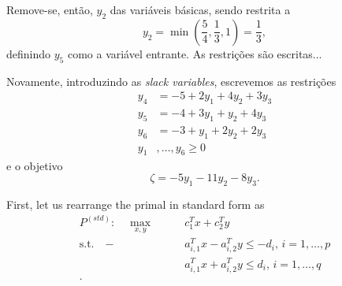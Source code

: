 \documentclass[a4paper]{report}
\begin{document}
Remove-se, então, $y_2$ das variáveis básicas, sendo restrita a \[
y_2 = \min\left( \frac{5}{4}, \frac{1}{3}, 1 \right) = \frac{1}{3}
,\] 
definindo $y_5$ como a variável entrante.
As restrições são escritas...  %



Novamente, introduzindo as \emph{slack variables}, escrevemos as restrições
\begin{align*}
    y_4 &= -5  +2y_1 + 4y_2 + 3y_3 \\
    y_5 &= -4 +3y_1 + y_2 + 4y_3  \\
    y_6 &= -3 + y_1 + 2y_2 + 2y_3  \\
    y_1&,\ldots,y_6 \ge 0
\end{align*}
e o objetivo \[
\zeta = -5y_1 - 11y_2 - 8y_3
.\] 




First, let us rearrange the primal in standard form as
\begin{align*}
    P^{(std)}:\quad \max_{x,y} \quad\quad & c_1^{T}x+c_2^{T}y \\
    \textrm{s.t.} \quad -&a_{i,1}^{T} x -a_{i,2}^{T}y \le  -d_i,\,i=1,\ldots,p \\
			 &a_{i,1}^{T} x + a_{i,2}^{T}y \le d_i,\,i=1,\ldots,q \\
.\end{align*}
\end{document}
